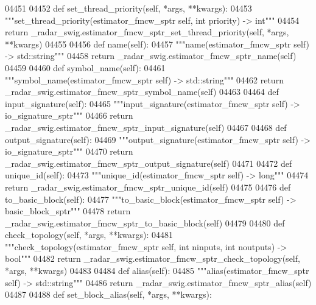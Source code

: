 \begin{DoxyCode}
{{{{{{{{{{{{{{{04451 
04452     \textcolor{keyword}{def }set_thread_priority(self, *args, **kwargs):
04453         \textcolor{stringliteral}{"""set\_thread\_priority(estimator\_fmcw\_sptr self, int priority) -> int"""}
04454         \textcolor{keywordflow}{return} \_radar\_swig.estimator\_fmcw\_sptr\_set\_thread\_priority(self, *args, **kwargs)
04455 
04456     \textcolor{keyword}{def }name(self):
04457         \textcolor{stringliteral}{"""name(estimator\_fmcw\_sptr self) -> std::string"""}
04458         \textcolor{keywordflow}{return} \_radar\_swig.estimator\_fmcw\_sptr\_name(self)
04459 
04460     \textcolor{keyword}{def }symbol_name(self):
04461         \textcolor{stringliteral}{"""symbol\_name(estimator\_fmcw\_sptr self) -> std::string"""}
04462         \textcolor{keywordflow}{return} \_radar\_swig.estimator\_fmcw\_sptr\_symbol\_name(self)
04463 
04464     \textcolor{keyword}{def }input_signature(self):
04465         \textcolor{stringliteral}{"""input\_signature(estimator\_fmcw\_sptr self) -> io\_signature\_sptr"""}
04466         \textcolor{keywordflow}{return} \_radar\_swig.estimator\_fmcw\_sptr\_input\_signature(self)
04467 
04468     \textcolor{keyword}{def }output_signature(self):
04469         \textcolor{stringliteral}{"""output\_signature(estimator\_fmcw\_sptr self) -> io\_signature\_sptr"""}
04470         \textcolor{keywordflow}{return} \_radar\_swig.estimator\_fmcw\_sptr\_output\_signature(self)
04471 
04472     \textcolor{keyword}{def }unique_id(self):
04473         \textcolor{stringliteral}{"""unique\_id(estimator\_fmcw\_sptr self) -> long"""}
04474         \textcolor{keywordflow}{return} \_radar\_swig.estimator\_fmcw\_sptr\_unique\_id(self)
04475 
04476     \textcolor{keyword}{def }to_basic_block(self):
04477         \textcolor{stringliteral}{"""to\_basic\_block(estimator\_fmcw\_sptr self) -> basic\_block\_sptr"""}
04478         \textcolor{keywordflow}{return} \_radar\_swig.estimator\_fmcw\_sptr\_to\_basic\_block(self)
04479 
04480     \textcolor{keyword}{def }check_topology(self, *args, **kwargs):
04481         \textcolor{stringliteral}{"""check\_topology(estimator\_fmcw\_sptr self, int ninputs, int noutputs) -> bool"""}
04482         \textcolor{keywordflow}{return} \_radar\_swig.estimator\_fmcw\_sptr\_check\_topology(self, *args, **kwargs)
04483 
04484     \textcolor{keyword}{def }alias(self):
04485         \textcolor{stringliteral}{"""alias(estimator\_fmcw\_sptr self) -> std::string"""}
04486         \textcolor{keywordflow}{return} \_radar\_swig.estimator\_fmcw\_sptr\_alias(self)
04487 
04488     \textcolor{keyword}{def }set_block_alias(self, *args, **kwargs):
}}}}}}}}}}}}}}}
\end{DoxyCode}
